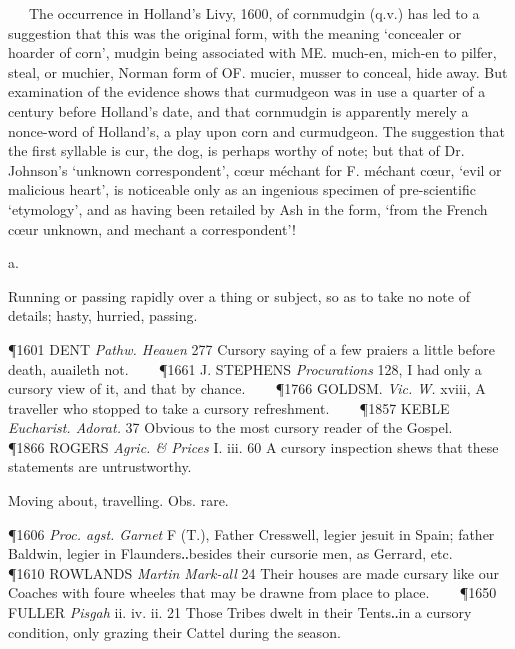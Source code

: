 \begin{description}[wide, labelwidth=!, labelindent=0pt]
   The occurrence in Holland's Livy, 1600, of cornmudgin (q.v.) has led to a suggestion that this was the original form, with the meaning ‘concealer or hoarder of corn’, mudgin being associated with ME. much-en, mich-en to pilfer, steal, or muchier, Norman form of OF. mucier, musser to conceal, hide away. But examination of the evidence shows that curmudgeon was in use a quarter of a century before Holland's date, and that cornmudgin is apparently merely a nonce-word of Holland's, a play upon corn and curmudgeon. The suggestion that the first syllable is cur, the dog, is perhaps worthy of note; but that of Dr. Johnson's ‘unknown correspondent’, cœur méchant for F. méchant cœur, ‘evil or malicious heart’, is noticeable only as an ingenious specimen of pre-scientific ‘etymology’, and as having been retailed by Ash in the form, ‘from the French cœur unknown, and mechant a correspondent’!


 a.

\noindent {}

\vspace{-0.3cm}

\begin{myenumerate}

 Running or passing rapidly over a thing or subject, so as to take no note of details; hasty, hurried, passing.

\P 1601 DENT  \textit{Pathw. Heauen} 277 Cursory saying of a few praiers a little before death, auaileth not.    
\P 1661 J. STEPHENS  \textit{Procurations} 128, I had only a cursory view of it, and that by chance.    
\P 1766 GOLDSM.  \textit{Vic. W.} xviii, A traveller who stopped to take a cursory refreshment.    
\P 1857 KEBLE  \textit{Eucharist. Adorat.} 37 Obvious to the most cursory reader of the Gospel.    
\P 1866 ROGERS  \textit{Agric. \& Prices} I. iii. 60 A cursory inspection shews that these statements are untrustworthy.

 Moving about, travelling. Obs. rare.

\P 1606 \textit{Proc.  agst. Garnet} F (T.), Father Cresswell, legier jesuit in Spain; father Baldwin, legier in Flaunders‥besides their cursorie men, as Gerrard, etc.    
\P 1610 ROWLANDS  \textit{Martin Mark-all} 24 Their houses are made cursary like our Coaches with foure wheeles that may be drawne from place to place.    
\P 1650 FULLER  \textit{Pisgah} ii. iv. ii. 21 Those Tribes dwelt in their Tents‥in a cursory condition, only grazing their Cattel during the season.


\end{myenumerate}
\end{description}
